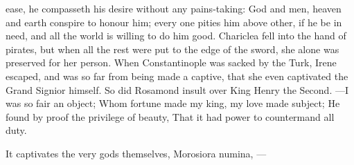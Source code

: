 ease, he compasseth his desire without any pains-taking: God and men,
heaven and earth conspire to honour him; every one pities him above
other, if he be in need, and all the world is willing to do him
good. Chariclea fell into the hand of pirates, but when all the
rest were put to the edge of the sword, she alone was preserved for her
person. When Constantinople was sacked by the Turk, Irene
escaped, and was so far from being made a captive, that she even
captivated the Grand Signior himself. So did Rosamond insult over King
Henry the Second.
---I was so fair an object;
Whom fortune made my king, my love made subject;
He found by proof the privilege of beauty,
That it had power to countermand all duty.

It captivates the very gods themselves, Morosiora numina,
---


